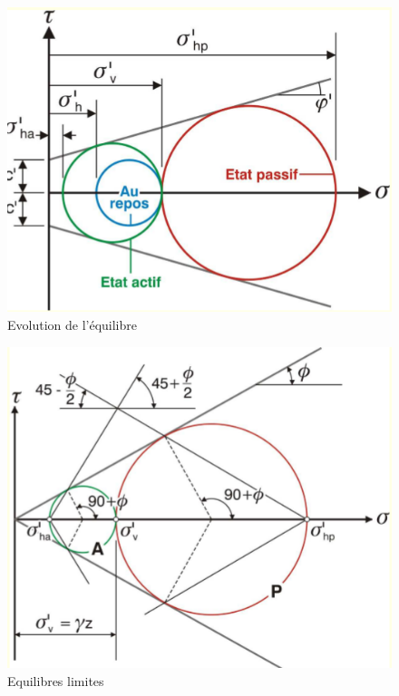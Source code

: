         \begin{multicols}{2}
            \begin{figure}[h!]
            \includegraphics[scale=0.5]{Holeyman/images/H3.PNG}
            \caption{Evolution de l'équilibre}
            \end{figure}
            \vfill\null\columnbreak
            \begin{figure}[h!]
            \includegraphics[scale=0.5]{Holeyman/images/H4.PNG}
            \caption{Equilibres limites}
            \end{figure}
        \end{multicols}
        
